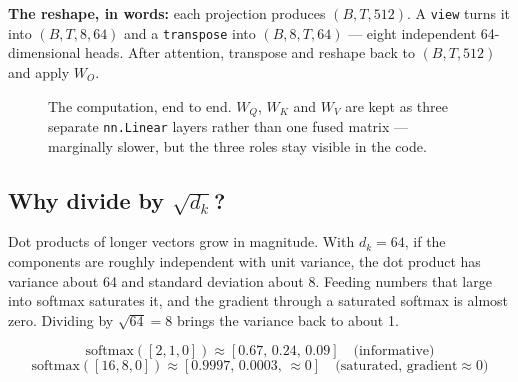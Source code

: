 \documentclass[11pt]{report}
\begin{document}
\textbf{The reshape, in words:} each projection produces $(B,T,512)$. A
\texttt{view} turns it into $(B,T,8,64)$ and a \texttt{transpose} into
$(B,8,T,64)$ --- eight independent 64-dimensional heads. After attention,
transpose and reshape back to $(B,T,512)$ and apply $W_O$.

\begin{figure}[htbp]
\centering
{}
\caption{The computation, end to end. $W_Q$, $W_K$ and $W_V$ are kept as three
separate \texttt{nn.Linear} layers rather than one fused matrix --- marginally
slower, but the three roles stay visible in the code.}
\end{figure}

\subsection{Why divide by \texorpdfstring{$\sqrt{d_k}$}{sqrt(d k)}?}

\begin{shortans}
Dot products of longer vectors grow in magnitude. With $d_k = 64$, if the
components are roughly independent with unit variance, the dot product has
variance about 64 and standard deviation about 8. Feeding numbers that large
into softmax saturates it, and the gradient through a saturated softmax is
almost zero. Dividing by $\sqrt{64} = 8$ brings the variance back to about 1.
\end{shortans}

\begin{vexample}
\[
\mathrm{softmax}([2,1,0]) \approx [0.67,\,0.24,\,0.09] \quad\text{(informative)}
\]
\[
\mathrm{softmax}([16,8,0]) \approx [0.9997,\,0.0003,\,{\approx}0] \quad\text{(saturated, gradient} \approx 0)
\]
\end{vexample}
\end{document}
